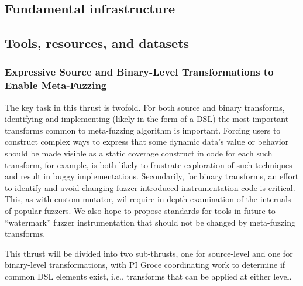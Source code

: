 \subsection{Fundamental infrastructure}



\subsection{Tools, resources, and datasets}


\subsubsection{Expressive Source and Binary-Level Transformations to 
Enable Meta-Fuzzing}

The key task in this thrust is twofold.  For both source and binary transforms, 
identifying and implementing (likely in the form of a DSL) the most important 
transforms common to meta-fuzzing algorithm is important.  Forcing users to 
construct complex ways to express that some dynamic data's value or behavior 
should be made visible as a static coverage construct in code for each such 
transform, for example, is both likely to frustrate exploration of such 
techniques and result in buggy implementations.  Secondarily, for binary 
transforms, an effort to identify and avoid changing fuzzer-introduced 
instrumentation code is critical.  This, as with custom mutator, wil require 
in-depth examination of the internals of popular fuzzers.  We also hope to 
propose standards for tools in future to ``watermark'' fuzzer instrumentation 
that should not be changed by meta-fuzzing transforms.

This thrust will be divided into two sub-thrusts, one for source-level and one 
for binary-level transformations, with PI Groce coordinating work to determine 
if common DSL elements exist, i.e., transforms that can be applied at either 
level.

